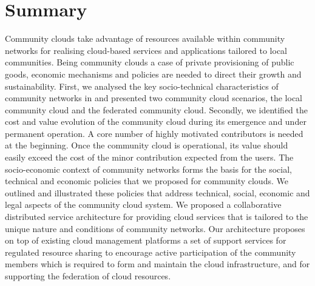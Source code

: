 

\section{Summary}
\label{sec:conclusion}

Community clouds take advantage of resources available within community networks for realising cloud-based services and applications tailored to local communities.
Being community clouds a case of private provisioning of public goods, economic mechanisms and policies are needed to direct their growth and sustainability. 
First, we analysed the key socio-technical characteristics of community networks in and presented two community cloud scenarios, the local community cloud and the federated community cloud. 
Secondly, we identified the cost and value evolution of the community cloud during its emergence and under permanent operation. 
A core number of highly motivated contributors is needed at the beginning. 
Once the community cloud is operational, its value should easily exceed the cost of the minor contribution expected from the users. 
The socio-economic context of community networks forms the basis for the social, technical and economic policies that we proposed for community clouds. 
We outlined and illustrated these policies that address technical, social, economic and legal aspects of the community cloud system.
%
%
%
We proposed a collaborative distributed service architecture for providing cloud services that is tailored to the unique nature and conditions of community networks. 
Our architecture proposes on top of existing cloud management platforms a set of support services for regulated resource sharing to encourage active participation of the community members which is required to form and maintain the cloud infrastructure, and for supporting the federation of cloud resources. 

